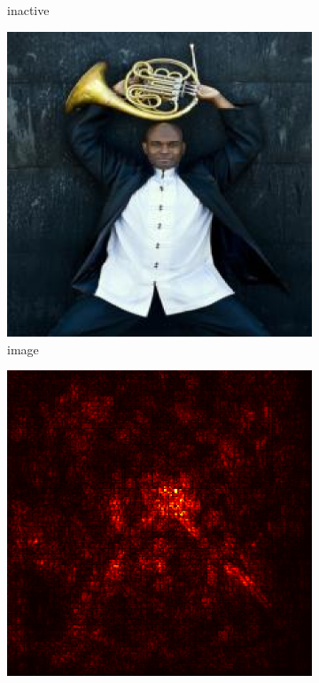 \documentclass[preprint,12pt]{elsarticle}
\begin{document}
\begin{figure}
\begin{subfigure}{0.14\textwidth}
        \caption{inactive}
    \end{subfigure}
    \hfill
    \begin{subfigure}{0.14\linewidth}
        \centering
        \includegraphics[width=\linewidth]{../visualizations/examples/imagenette/resnet18/images/7.png}
        \caption{image}
    \end{subfigure}
    \hfill
    \begin{subfigure}{0.14\linewidth}
        \centering
        \includegraphics[width=\linewidth]{../visualizations/examples/imagenette/resnet18/saliency_map/7.png}

\end{subfigure}
\end{figure}
\end{document}
